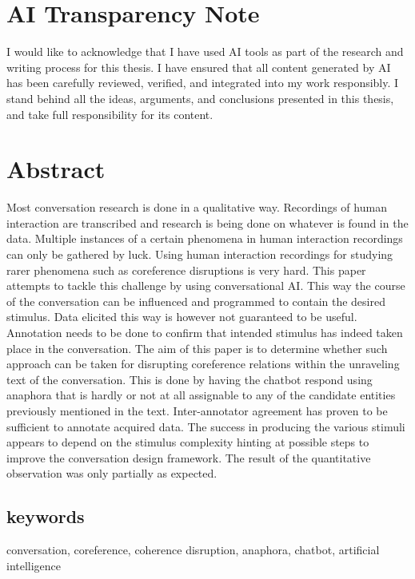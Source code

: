 \documentclass[12pt]{report}
\begin{document}
   \section*{AI Transparency Note}
   I would like to acknowledge that I have used AI tools as part of the research and writing process for this thesis.
   I have ensured that all content generated by AI has been carefully reviewed, verified, and integrated into my work responsibly.
   I stand behind all the ideas, arguments, and conclusions presented in this thesis, and take full responsibility for its content.


   \newpage





   \thispagestyle{empty}

   \section*{Abstract}
   Most conversation research is done in a qualitative way.
   Recordings of human interaction are transcribed and research is being done on whatever is found in the data.
   Multiple instances of a certain phenomena in human interaction recordings can only be gathered by luck.
   Using human interaction recordings for
   studying rarer phenomena such as coreference disruptions is very hard.
   This paper attempts to tackle this challenge by using conversational AI.
   This way the course of the conversation can be influenced and
   programmed to contain the desired stimulus.
   Data elicited this way is however not guaranteed to be useful.
   Annotation needs to be done to confirm that intended stimulus has indeed taken place in the conversation.
   The aim of this paper is to determine whether such approach can be taken for disrupting coreference relations
   within the unraveling text of the conversation.
   This is done by having the chatbot respond using anaphora that is hardly or not at all assignable
   to any of the candidate entities previously mentioned in the text.
   Inter-annotator agreement has proven to be sufficient to annotate acquired data.
   The success in producing the various stimuli appears to depend on the stimulus complexity
   hinting at possible steps to improve the conversation design framework.
   The result of the quantitative observation was only partially as expected.

   \subsection*{keywords}
   conversation, coreference, coherence disruption, anaphora, chatbot, artificial intelligence
\end{document}
